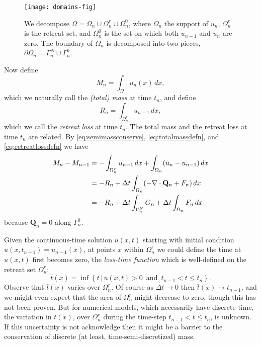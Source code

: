 \documentclass[final,leqno,onefignum,onetabnum]{siamltex1213bueler}
\newcommand\bQ{\mathbf{Q}}
\newcommand{\Div}{\nabla\cdot}
\begin{document}
\begin{figure}[ht]
\begin{center}
\texttt{[image: domains-fig]}
\end{center}
\caption{We decompose $\Omega = \Omega_n \cup \Omega_n^r \cup \Omega_n^0$, where $\Omega_n$ the support of $u_n$, $\Omega_n^r$ is the retreat set, and $\Omega_n^0$ is the set on which both $u_{n-1}$ and $u_n$ are zero.  The boundary of $\Omega_n$ is decomposed into two pieces, $\partial\Omega_n = \Gamma_n^N \cup \Gamma_n^0$.}
\label{fig:domains}
\end{figure}

Now define
\begin{equation}
M_n = \int_\Omega u_n(x)\,dx, \label{eq:totalmassdefn}
\end{equation}
which we naturally call the \emph{(total) mass} at time $t_n$, and define
\begin{equation}
R_n = \int_{\Omega_n^r} u_{n-1}\,dx, \label{eq:retreatlossdefn}
\end{equation}
which we call the \emph{retreat loss} at time $t_n$.  The total mass and the retreat loss at time $t_n$ are related.  By \eqref{eq:semimassconserve}, \eqref{eq:totalmassdefn}, and \eqref{eq:retreatlossdefn} we have
\begin{align}
M_n - M_{n-1} &=  - \int_{\Omega_n^r} u_{n-1}\,dx + \int_{\Omega_n} (u_n - u_{n-1})\,dx \label{eq:massstep} \\
   &= - R_n + \Delta t \int_{\Omega_n} (- \Div \bQ_n + F_n) \,dx \notag \\
   &= - R_n + \Delta t \int_{\Gamma_n^N} G_n + \Delta t \int_{\Omega_n} F_n\,dx \notag
\end{align}
because $\bQ_n=0$ along $\Gamma_n^0$.

Given the continuous-time solution $u(x,t)$ starting with initial condition $u(x,t_{n-1}) = u_{n-1}(x)$, at points $x$ within $\Omega_n^r$ we could define the time at $u(x,t)$ first becomes zero, the \emph{loss-time function} which is well-defined on the retreat set $\Omega_n^r$:
\begin{equation}
\bar t(x) = \inf\left\{t \,\big|\, u(x,t)>0 \,\text{ and }\, t_{n-1} < t \le t_n\right\}.
\end{equation}
Observe that $\bar t(x)$ varies over $\Omega_n^r$.  Of course as $\Delta t \to 0$ then $\bar t(x) \to t_{n-1}$, and we might even expect that the area of $\Omega_n^r$ might decrease to zero, though this has not been proven.  But for numerical models, which necessarily have discrete time, the variation in $\bar t(x)$, over $\Omega_n^r$ during the time-step $t_{n-1} < t \le t_n$, is unknown.  If this uncertainty is not acknowledge then it might be a barrier to the conservation of discrete (at least, time-semi-discretized) mass.
\end{document}
